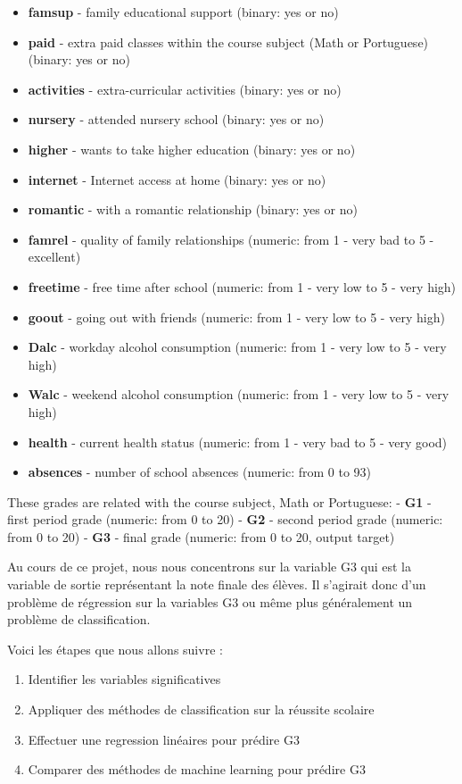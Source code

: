 \documentclass[
]{article}
\providecommand{\tightlist}{%
  \setlength{\itemsep}{0pt}\setlength{\parskip}{0pt}}
\begin{document}
\begin{itemize}
\item
  \textbf{famsup} - family educational support (binary: yes or no)
\item
  \textbf{paid} - extra paid classes within the course subject (Math or
  Portuguese) (binary: yes or no)
\item
  \textbf{activities} - extra-curricular activities (binary: yes or no)
\item
  \textbf{nursery} - attended nursery school (binary: yes or no)
\item
  \textbf{higher} - wants to take higher education (binary: yes or no)
\item
  \textbf{internet} - Internet access at home (binary: yes or no)
\item
  \textbf{romantic} - with a romantic relationship (binary: yes or no)
\item
  \textbf{famrel} - quality of family relationships (numeric: from 1 -
  very bad to 5 - excellent)
\item
  \textbf{freetime} - free time after school (numeric: from 1 - very low
  to 5 - very high)
\item
  \textbf{goout} - going out with friends (numeric: from 1 - very low to
  5 - very high)
\item
  \textbf{Dalc} - workday alcohol consumption (numeric: from 1 - very
  low to 5 - very high)
\item
  \textbf{Walc} - weekend alcohol consumption (numeric: from 1 - very
  low to 5 - very high)
\item
  \textbf{health} - current health status (numeric: from 1 - very bad to
  5 - very good)
\item
  \textbf{absences} - number of school absences (numeric: from 0 to 93)
\end{itemize}

These grades are related with the course subject, Math or Portuguese: -
\textbf{G1} - first period grade (numeric: from 0 to 20) - \textbf{G2} -
second period grade (numeric: from 0 to 20) - \textbf{G3} - final grade
(numeric: from 0 to 20, output target)

Au cours de ce projet, nous nous concentrons sur la variable G3 qui est
la variable de sortie représentant la note finale des élèves. Il
s'agirait donc d'un problème de régression sur la variables G3 ou même
plus généralement un problème de classification.

Voici les étapes que nous allons suivre :

\begin{enumerate}
\def\labelenumi{\arabic{enumi}.}
\tightlist
\item
  Identifier les variables significatives
\item
  Appliquer des méthodes de classification sur la réussite scolaire
\item
  Effectuer une regression linéaires pour prédire G3
\item
  Comparer des méthodes de machine learning pour prédire G3
\end{enumerate}
\end{document}
